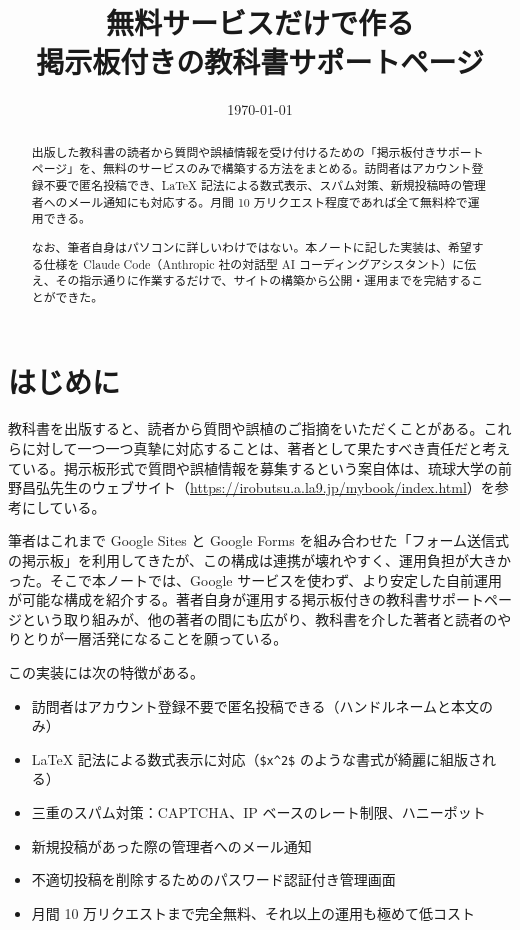 \documentclass[11pt,a4paper,uplatex,dvipdfmx]{jsarticle}
\title{無料サービスだけで作る\\掲示板付きの教科書サポートページ}
\author{}
\date{\today}
\begin{document}
\maketitle

\begin{abstract}
出版した教科書の読者から質問や誤植情報を受け付けるための「掲示板付きサポートページ」を、無料のサービスのみで構築する方法をまとめる。訪問者はアカウント登録不要で匿名投稿でき、\LaTeX{} 記法による数式表示、スパム対策、新規投稿時の管理者へのメール通知にも対応する。月間 10 万リクエスト程度であれば全て無料枠で運用できる。

なお、筆者自身はパソコンに詳しいわけではない。本ノートに記した実装は、希望する仕様を Claude Code（Anthropic 社の対話型 AI コーディングアシスタント）に伝え、その指示通りに作業するだけで、サイトの構築から公開・運用までを完結することができた。
\end{abstract}

\tableofcontents

\section{はじめに}

教科書を出版すると、読者から質問や誤植のご指摘をいただくことがある。これらに対して一つ一つ真摯に対応することは、著者として果たすべき責任だと考えている。掲示板形式で質問や誤植情報を募集するという案自体は、琉球大学の前野昌弘先生のウェブサイト（\url{https://irobutsu.a.la9.jp/mybook/index.html}）を参考にしている。

筆者はこれまで Google Sites と Google Forms を組み合わせた「フォーム送信式の掲示板」を利用してきたが、この構成は連携が壊れやすく、運用負担が大きかった。そこで本ノートでは、Google サービスを使わず、より安定した自前運用が可能な構成を紹介する。著者自身が運用する掲示板付きの教科書サポートページという取り組みが、他の著者の間にも広がり、教科書を介した著者と読者のやりとりが一層活発になることを願っている。

この実装には次の特徴がある。
\begin{itemize}
\item 訪問者はアカウント登録不要で匿名投稿できる（ハンドルネームと本文のみ）
\item \LaTeX{} 記法による数式表示に対応（\texttt{\$x\^{}2\$} のような書式が綺麗に組版される）
\item 三重のスパム対策：CAPTCHA、IP ベースのレート制限、ハニーポット
\item 新規投稿があった際の管理者へのメール通知
\item 不適切投稿を削除するためのパスワード認証付き管理画面
\item 月間 10 万リクエストまで完全無料、それ以上の運用も極めて低コスト
\end{itemize}
\end{document}
